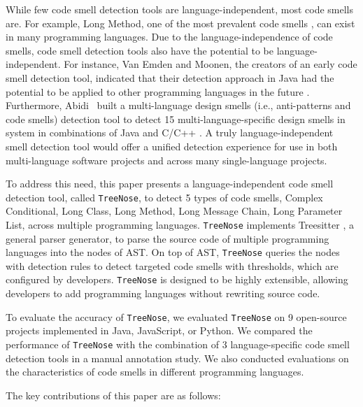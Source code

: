 While few code smell detection tools are language-independent, most code smells
are. For example, Long Method, one of the most prevalent code smells
\cite{developersCare}, can exist in many programming languages. Due to the
language-independence of code smells, code smell detection tools also have the
potential to be language-independent. For instance, Van Emden and Moonen, the
creators of an early code smell detection tool, indicated that their detection
approach in Java had the potential to be applied to other programming languages
in the future \cite{1173068}. Furthermore, Abidi~\etal{} built a multi-language
design smells (i.e., anti-patterns and code smells) detection tool to detect 15
multi-language-specific design smells in system in combinations of Java and
C/C++ \cite{MultiLanguageCodeSmells,Fault-Prone}. A truly language-independent
smell detection tool would offer a unified detection experience for use in both
multi-language software projects and across many single-language projects.



To address this need, this paper presents a language-independent code smell
detection tool, called \texttt{TreeNose}, to detect 5 types of code smells,
Complex Conditional, Long Class, Long Method, Long Message Chain, Long Parameter
List, across multiple programming languages. \texttt{TreeNose} implements
Treesitter \cite{treeSitter}, a general parser generator, to parse the source
code of multiple programming languages into the nodes of AST. On top of AST,
\texttt{TreeNose} queries the nodes with detection rules to detect targeted code
smells with thresholds, which are configured by developers. \texttt{TreeNose} is
designed to be highly extensible, allowing developers to add programming
languages without rewriting source code.

To evaluate the accuracy of \texttt{TreeNose}, we evaluated \texttt{TreeNose} on
9 open-source projects implemented in Java, JavaScript, or Python. We compared
the performance of \texttt{TreeNose} with the combination of 3 language-specific
code smell detection tools in a manual annotation study. We also conducted
evaluations on the characteristics of code smells in different programming
languages.

The key contributions of this paper are as follows:

